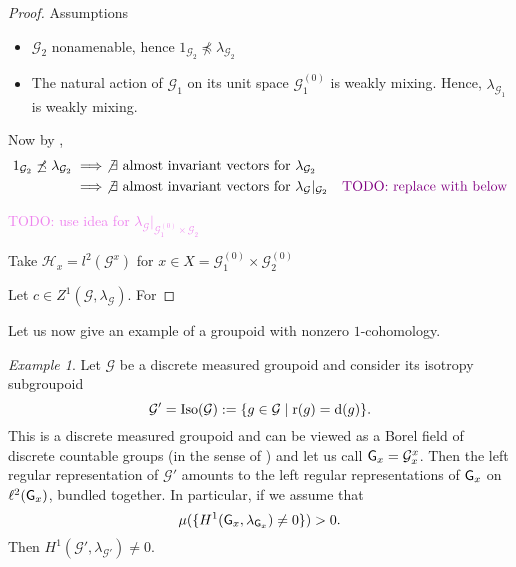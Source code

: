 \documentclass[a4paper,11pt]{article}
\numberwithin{equation}{section}
\theoremstyle{definition}
\theoremstyle{remark}
\newtheorem{ex}[thm]{Example}
\numberwithin{equation}{section}
\newcommand{\rG}{\mathcal{G}}
\def\H{\mathcal H}
\def\r{{\rm r}}
\def\d{{\rm d}}
\def\G{{\sf G}}
\providecommand{\norm}[1]{\lVert#1\rVert}
\numberwithin{equation}{section}
\begin{document}
\begin{proof}
  Assumptions
  \begin{itemize}
    \item $ \rG_{2} $ nonamenable, hence $ 1_{\rG_{2}}\not\preceq \lambda_{\rG_{2}} $
    \item The natural action of $ \rG_{1} $ on its unit space $ \rG_{1}^{(0)} $ is weakly mixing. Hence, $ \lambda_{\rG_{1}} $ is weakly mixing.
  \end{itemize}

  Now by \textcite[Theorem 6.1.4]{anatharaman:amenableGrpds},
  \begin{align*}
    1_{\rG_{2}}\not\preceq \lambda_{\rG_{2}} &\implies \not\exists \text{ almost invariant vectors for $ \lambda_{\rG_{2}} $}\\
    &\implies \not\exists \text{ almost invariant vectors for $ \lambda_{\rG}\vert_{\rG_{2}} $} \quad \text{\textcolor{violet}{TODO: replace with below}}
  \end{align*}

  \textcolor{violet}{TODO: use idea for $ \lambda_{\rG}\vert_{\rG_{1}^{(0)}\times\rG_{2}} $}

  Take $ \H_{x} = l^{2}(\rG^{x}) $ for $ x\in X = \rG_{1}^{(0)}\times \rG_{2}^{(0)} $
    

  Let $ c\in Z^{1}(\rG, \lambda_{\rG}) $. For 

  
\end{proof}

Let us now give an example of a groupoid with nonzero $1$-cohomology. 

\begin{ex}
    Let $\rG$ be a discrete measured groupoid and consider its isotropy subgroupoid $$
    \rG'={\rm Iso}(\rG):=\{g\in\rG\mid \r(g)=\d(g)\}.
    $$ This is a discrete measured groupoid and can be viewed as a Borel field of discrete countable groups (in the sense of \textcite{sutherland:94}) and let us call $\G_x=\rG_x^x$. Then the left regular representation of $\rG'$ amounts to the left regular representations of $\G_x$ on $\ell^2(\G_x)$, bundled together. In particular, if we assume that 
    $$\mu(\{H^1(\G_x,\lambda_{\G_x})\ne 0 \})>0.$$  Then $H^1(\rG',\lambda_{\rG'})\ne 0$.
\end{ex}
\end{document}
